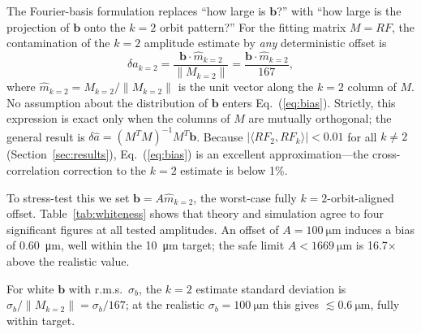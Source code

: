 \documentclass[preprint,12pt]{elsarticle}
\begin{document}
The Fourier-basis formulation replaces ``how large is $\mathbf{b}$?'' with
``how large is the projection of $\mathbf{b}$ onto the $k=2$ orbit pattern?''
For the fitting matrix $M=RF$, the contamination of the $k=2$ amplitude
estimate by \emph{any} deterministic offset is
\begin{equation}
\delta a_{k=2} = \frac{\mathbf{b}\cdot\hat{m}_{k=2}}{\|M_{k=2}\|}
               = \frac{\mathbf{b}\cdot\hat{m}_{k=2}}{167},
\label{eq:bias}
\end{equation}
where $\hat{m}_{k=2}=M_{k=2}/\|M_{k=2}\|$ is the unit vector along the
$k=2$ column of $M$. No assumption about the distribution of $\mathbf{b}$
enters Eq.~(\ref{eq:bias}). Strictly, this expression is exact only when the
columns of $M$ are mutually orthogonal; the general result is
$\delta\hat{a}=(M^TM)^{-1}M^T\mathbf{b}$.
Because $|\langle RF_2,RF_k\rangle|<0.01$ for all $k\neq2$ (Section~\ref{sec:results}),
Eq.~(\ref{eq:bias}) is an excellent approximation—the cross-correlation
correction to the $k=2$ estimate is below 1\%.

To stress-test this we set $\mathbf{b}=A\hat{m}_{k=2}$, the worst-case
fully $k=2$-orbit-aligned offset. Table~\ref{tab:whiteness} shows that
theory and simulation agree to four significant figures at all tested
amplitudes. An offset of $A=\SI{100}{\micro\meter}$ induces a
bias of \SI{0.60}{\micro\meter}, well within the \SI{10}{\micro\meter} target;
the safe limit $A<\SI{1669}{\micro\meter}$ is 16.7$\times$ above the
realistic value.

For white $\mathbf{b}$ with r.m.s.\ $\sigma_b$, the $k=2$ estimate standard
deviation is $\sigma_b/\|M_{k=2}\|=\sigma_b/167$; at the realistic
$\sigma_b=\SI{100}{\micro\meter}$ this gives $\lesssim\SI{0.6}{\micro\meter}$,
fully within target.
\end{document}
